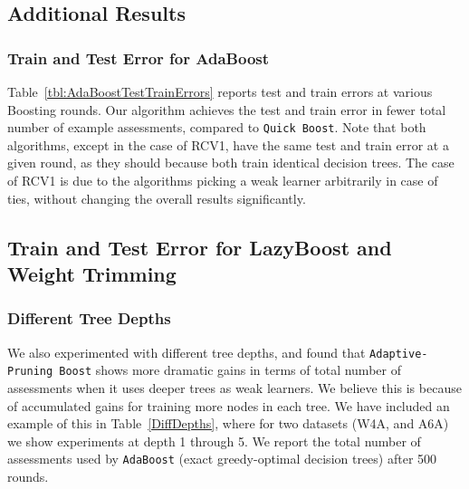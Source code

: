 \subsection{Additional Results}
\subsubsection{Train and Test Error for AdaBoost}
Table~\ref{tbl:AdaBoostTestTrainErrors} reports test and train errors at various Boosting rounds. Our algorithm achieves the test and train error in fewer total number of example assessments, compared to \texttt{Quick Boost}. Note that both algorithms, except in the case of RCV1, have the same test and train error at a given round, as they should because both train identical decision trees. The case of RCV1 is due to the algorithms picking a weak learner arbitrarily in case of ties, without changing the overall results significantly.


\subsection{Train and Test Error for LazyBoost and Weight Trimming}






\clearpage
\subsubsection {Different Tree Depths}

We also experimented with different tree depths, and found that \texttt{Adaptive-Pruning Boost} shows more dramatic gains in terms of total number of assessments when it uses deeper trees as weak learners.
We believe this is because of accumulated gains for training more nodes
in each tree. 
We have included an example of this in Table~\ref{DiffDepths}, where for two datasets (W4A, and A6A) we show experiments at depth 1 through 5. We report the total number of assessments used by \texttt{AdaBoost} (exact greedy-optimal decision trees) after 500 rounds.

\clearpage

%
%
%
